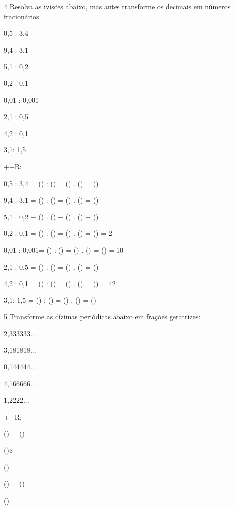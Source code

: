 \num{4} Resolva as ivisões abaixo, mas antes transforme os decimais em
números fracionários.
\item 0,5 : 3,4
\item 9,4 : 3,1
\item 5,1 : 0,2
\item 0,2 : 0,1
\item 0,01 : 0,001
\item 2,1 : 0,5
\item 4,2 : 0,1
\item 3,1: 1,5

++R:
\item 0,5 : 3,4 = () : () = () . () = ()
\item 9,4 : 3,1 = () : () = () . () = ()
\item 5,1 : 0,2 = () : () = () . () = ()
\item 0,2 : 0,1 = () : () = () . () = () = 2
\item 0,01 : 0,001= () : () = () . () = () = 10
\item 2,1 : 0,5 = () : () = () . () = ()
\item 4,2 : 0,1 = () : () = () . () = () = 42
\item 3,1: 1,5 = () : () = () . () = ()

\num{5} Transforme as dízimas periódicas abaixo em frações geratrizes:
\item 2,333333...
\item 3,181818...
\item 0,144444...
\item 4,166666...
\item 1,2222...

++R:
\item () = ()
\item ()\$
\item ()
\item () = ()
\item ()

